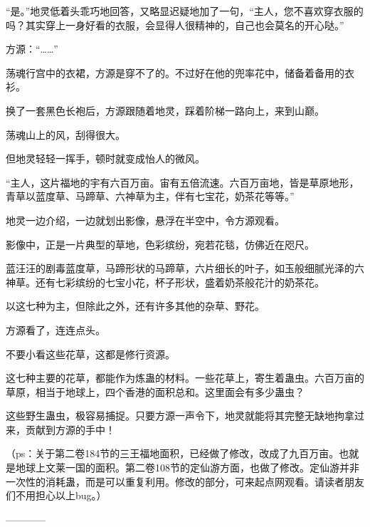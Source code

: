 \begin{this_body}
“是。”地灵低着头乖巧地回答，又略显迟疑地加了一句，“主人，您不喜欢穿衣服的吗？其实穿上一身好看的衣服，会显得人很精神的，自己也会莫名的开心哒。”

方源：“……”

荡魂行宫中的衣裙，方源是穿不了的。不过好在他的兜率花中，储备着备用的衣衫。

换了一套黑色长袍后，方源跟随着地灵，踩着阶梯一路向上，来到山巅。

荡魂山上的风，刮得很大。

但地灵轻轻一挥手，顿时就变成怡人的微风。

“主人，这片福地的宇有六百万亩。宙有五倍流速。六百万亩地，皆是草原地形，青草以蓝度草、马蹄草、六神草为主，伴有七宝花，奶茶花等等。”

地灵一边介绍，一边就划出影像，悬浮在半空中，令方源观看。

影像中，正是一片典型的草地，色彩缤纷，宛若花毯，仿佛近在咫尺。

蓝汪汪的剧毒蓝度草，马蹄形状的马蹄草，六片细长的叶子，如玉般细腻光泽的六神草。还有七彩缤纷的七宝小花，杯子形状，盛着奶茶般花汁的奶茶花。

以这七种为主，但除此之外，还有许多其他的杂草、野花。

方源看了，连连点头。

不要小看这些花草，这都是修行资源。

这七种主要的花草，都能作为炼蛊的材料。一些花草上，寄生着蛊虫。六百万亩的草原，相当于地球上，四个香港的面积总和。这里面会有多少蛊虫？

这些野生蛊虫，极容易捕捉。只要方源一声令下，地灵就能将其完整无缺地拘拿过来，贡献到方源的手中！

（ps：关于第二卷184节的三王福地面积，已经做了修改，改成了九百万亩。也就是地球上文莱一国的面积。第二卷108节的定仙游方面，也做了修改。定仙游并非一次性的消耗蛊，而是可以重复利用。修改的部分，可来起点网观看。请读者朋友们不用担心以上bug。）

------------

\end{this_body}

